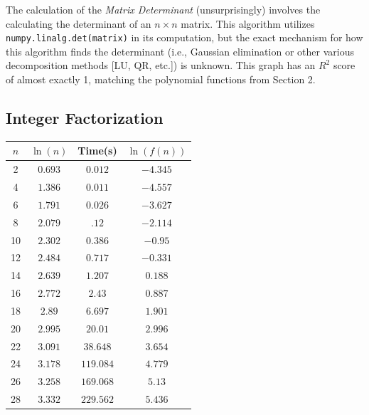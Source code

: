 \documentclass{article}
\begin{document}
    The calculation of the \textit{Matrix Determinant} (unsurprisingly) involves the calculating the determinant of an $n \times n$ matrix. This algorithm utilizes \texttt{numpy.linalg.det(matrix)} in its computation, but the exact mechanism for how this algorithm finds the determinant (i.e., Gaussian elimination or other various decomposition methods [LU, QR, etc.]) is unknown. This graph has an $R^2$ score of almost exactly 1, matching the polynomial functions from Section 2.

    \subsection{Integer Factorization}

    

    \begin{minipage}{0.4\textwidth} %
    \centering

    
    
    \begin{tabular}{c|c|c|c}
        $n$ & $\ln(n)$ & Time(s) & $\ln(f(n))$ \\ \hline
        2 & $0.693$ & $0.012$ & $-4.345$ \\\hline
        4 & $1.386$ & $0.011$ & $-4.557$  \\\hline
        6 & $1.791$ & $0.026$ & $-3.627$\\\hline
        8 & $2.079$ & $.12$ & $-2.114$\\\hline
        10 & $2.302$ & $0.386$ & $-0.95$\\ \hline
        12 & $2.484$ & $0.717$ & $-0.331$\\ \hline
        14 & $2.639$& $1.207$ & $0.188$\\ \hline
        16 & $2.772$ & $2.43$ & $0.887$\\ \hline
        18 & $2.89$ & $6.697$ & $1.901$\\ \hline
        20 & $2.995$ & $20.01$ & $2.996$\\ \hline
        22 & $3.091$ & $38.648$ & $3.654$\\ \hline
        24 & $3.178$ & $119.084$ & $4.779$\\ \hline
        26 & $3.258$ & $169.068$ & $5.13$\\ \hline
        28 & $3.332$ & $229.562$ & $5.436$\\
    \end{tabular}
    
\end{minipage}%
\end{document}
